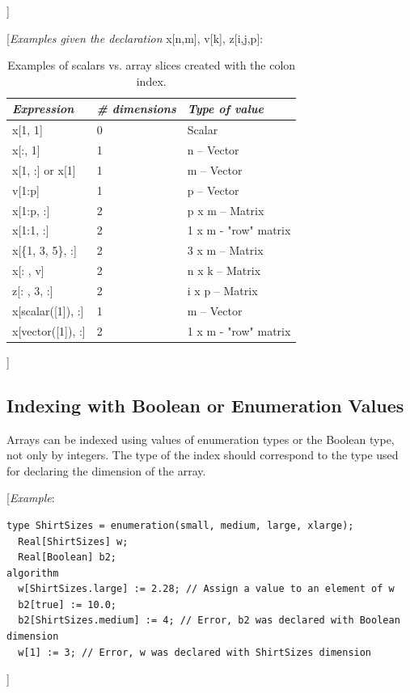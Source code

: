 \documentclass[10pt,a4paper]{report}
\def\doublelabel#1{\label{#1}}
\begin{document}
{]}

{[}\emph{Examples given the declaration} x{[}n,m{]}, v{[}k{]}, z{[}i,j,p{]}:

\begin{longtable}[]{|l|l|l|}
\caption{Examples of scalars vs. array slices created with the colon index.}\\
\hline
\emph{Expression} & \emph{\# dimensions} & \emph{Type of value}\\ \hline
\endhead
x{[}1, 1{]} & 0 & Scalar\\ \hline
x{[}:, 1{]} & 1 & n -- Vector\\ \hline
x{[}1, :{]} or x{[}1{]} & 1 & m -- Vector\\ \hline
v{[}1:p{]} & 1 & p -- Vector\\ \hline
x{[}1:p, :{]} & 2 & p x m -- Matrix\\ \hline
x{[}1:1, :{]} & 2 & 1 x m - "row" matrix\\ \hline
x{[}\{1, 3, 5\}, :{]} & 2 & 3 x m -- Matrix\\ \hline
x{[}: , v{]} & 2 & n x k -- Matrix\\ \hline
z{[}: , 3, :{]} & 2 & i x p -- Matrix\\ \hline
x{[}scalar({[}1{]}), :{]} & 1 & m -- Vector\\ \hline
x{[}vector({[}1{]}), :{]} & 2 & 1 x m - "row" matrix\\ \hline

\end{longtable}

{]}

\subsection{Indexing with Boolean or Enumeration Values}\doublelabel{indexing-with-boolean-or-enumeration-values}

Arrays can be indexed using values of enumeration types or the Boolean
type, not only by integers. The type of the index should correspond to
the type used for declaring the dimension of the array.

{[}\emph{Example}:

\begin{lstlisting}[language=modelica]
  type ShirtSizes = enumeration(small, medium, large, xlarge);
  Real[ShirtSizes] w;
  Real[Boolean] b2;
algorithm
  w[ShirtSizes.large] := 2.28; // Assign a value to an element of w
  b2[true] := 10.0;
  b2[ShirtSizes.medium] := 4; // Error, b2 was declared with Boolean dimension
  w[1] := 3; // Error, w was declared with ShirtSizes dimension
\end{lstlisting}
{]}
\end{document}
